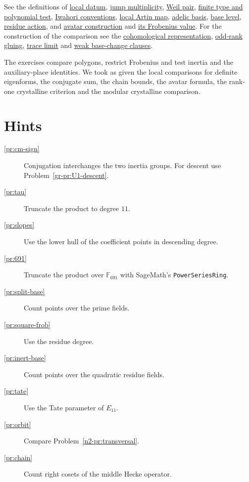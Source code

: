 \documentclass[reqno]{amsart}
\theoremstyle{definition}
\newcommand{\F}{\mathbb F}
\newcommand{\leansrc}[3]{\href{https://github.com/lsernau/grh-lean/blob/72fead1/grh/src/#1\#L#2}{#3}}
\begin{document}
See the definitions of
\leansrc{Lib/GaloisRep/Main/LocalConditions.lean}{63}{local datum},
\leansrc{Lib/PadicHodge/Crystalline/Basic.lean}{196}{jump multiplicity},
\leansrc{Lib/PadicHodge/Crystalline/Basic.lean}{134}{Weil pair},
\leansrc{Lib/GaloisRep/Main/LocalConditions.lean}{96}{finite type and polynomial test},
\leansrc{Lib/LocalGL/Iwahori/ParahoricStructure.lean}{135}{Iwahori conventions},
\leansrc{Lib/ClassField/GaloisCohomology/ContinuousCocycles.lean}{435}{local Artin map},
\leansrc{Lib/Adelic/Unitary/Defs.lean}{498}{adelic basis},
\leansrc{Lib/GaloisRep/TaylorWiles.lean}{167}{base level},
\leansrc{Lib/GaloisRep/TaylorWiles.lean}{534}{residue action},
and \leansrc{Lib/PadicHodge/Characters.lean}{90}{avatar construction} and
\leansrc{Lib/PadicHodge/Characters.lean}{1029}{its Frobenius value}.
For the construction of the comparison see the
\leansrc{Lib/Shimura/Eigenspace.lean}{689}{cohomological representation},
\leansrc{Lib/GaloisRep/Main/OddRank.lean}{418}{odd-rank gluing},
\leansrc{Lib/GaloisRep/Main/SplitCase.lean}{567}{trace limit} and
\leansrc{Lib/GaloisRep/BaseChange/PrimeDegreeTransfer.lean}{60}{weak base-change clauses}.

The exercises compare polygons, restrict Frobenius and test inertia and the auxiliary-place identities.  We took as given the local comparisons for definite eigenforms, the conjugate sum, the chain bounds, the avatar formula, the rank-one crystalline criterion and the modular crystalline comparison.

\section*{Hints}

\begin{description}
\item[\ref{pr:cm-sign}] Conjugation interchanges the two inertia groups.  For descent use Problem~\ref{gr-pr:U1-descent}.
\item[\ref{pr:tau}] Truncate the product to degree \(11\).
\item[\ref{pr:slopes}] Use the lower hull of the coefficient points in descending degree.
\item[\ref{pr:691}] Truncate the product over \(\F_{691}\) with SageMath's \texttt{PowerSeriesRing}.
\item[\ref{pr:split-base}] Count points over the prime fields.
\item[\ref{pr:square-frob}] Use the residue degree.
\item[\ref{pr:inert-base}] Count points over the quadratic residue fields.
\item[\ref{pr:tate}] Use the Tate parameter of \(E_{11}\).
\item[\ref{pr:orbit}] Compare Problem~\ref{n2-pr:transversal}.
\item[\ref{pr:chain}] Count right cosets of the middle Hecke operator.
\end{description}
\end{document}
